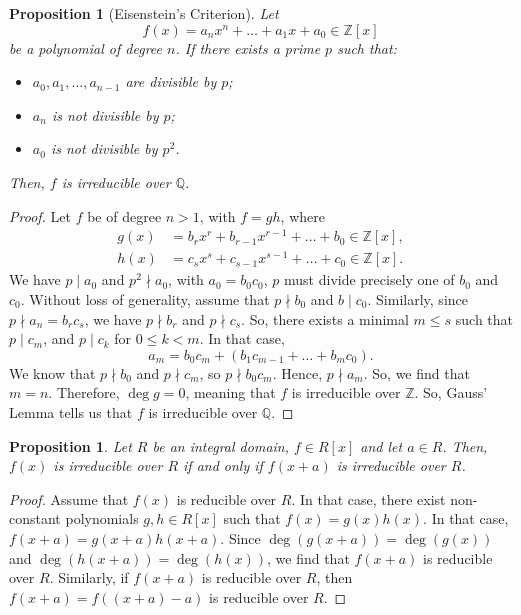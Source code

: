 \documentclass[a4paper, openany]{memoir}
\theoremstyle{definition}
\theoremstyle{plain}
\newtheorem{proposition}[definition]{Proposition}
\begin{document}
    \begin{proposition}[Eisenstein's Criterion]
        Let 
        \[f(x) = a_n x^n + \dots + a_1 x + a_0 \in \mathbb{Z}[x]\]
        be a polynomial of degree $n$. If there exists a prime $p$ such that:
        \begin{itemize}
            \item $a_0, a_1, \dots, a_{n-1}$ are divisible by $p$;
            \item $a_n$ is not divisible by $p$;
            \item $a_0$ is not divisible by $p^2$.
        \end{itemize}
        Then, $f$ is irreducible over $\mathbb{Q}$.
    \end{proposition}
    \begin{proof}
        Let $f$ be of degree $n > 1$, with $f = gh$, where
        \begin{align*}
            g(x) &= b_r x^r + b_{r-1} x^{r-1} + \dots + b_0 \in \mathbb{Z}[x], \\
            h(x) &= c_s x^s + c_{s-1} x^{s-1} + \dots + c_0 \in \mathbb{Z}[x].
        \end{align*}
        We have $p \mid a_0$ and $p^2 \nmid a_0$, with $a_0 = b_0 c_0$, $p$ must divide precisely one of $b_0$ and $c_0$. Without loss of generality, assume that $p \nmid b_0$ and $b \mid c_0$. Similarly, since $p \nmid a_n = b_r c_s$, we have $p \nmid b_r$ and $p \nmid c_s$. So, there exists a minimal $m \leq s$ such that $p \mid c_m$, and $p \mid c_k$ for $0 \leq k < m$. In that case,
        \[a_m = b_0 c_m + (b_1 c_{m-1} + \dots + b_m c_0).\]
        We know that $p \nmid b_0$ and $p \nmid c_m$, so $p \nmid b_0 c_m$. Hence, $p \nmid a_m$. So, we find that $m = n$. Therefore, $\deg g = 0$, meaning that $f$ is irreducible over $\mathbb{Z}$. So, Gauss' Lemma tells us that $f$ is irreducible over $\mathbb{Q}$.
    \end{proof}

    \begin{proposition}
        Let $R$ be an integral domain, $f \in R[x]$ and let $a \in R$. Then, $f(x)$ is irreducible over $R$ if and only if $f(x + a)$ is irreducible over $R$.
    \end{proposition}
    \begin{proof}
        Assume that $f(x)$ is reducible over $R$. In that case, there exist non-constant polynomials $g, h \in R[x]$ such that $f(x) = g(x) h(x)$. In that case, $f(x + a) = g(x + a) h(x + a)$. Since $\deg (g(x  + a)) = \deg (g(x))$ and $\deg (h(x + a)) = \deg (h(x))$, we find that $f(x + a)$ is reducible over $R$. Similarly, if $f(x + a)$ is reducible over $R$, then $f(x + a) = f((x + a) - a)$ is reducible over $R$.
    \end{proof}
\end{document}
